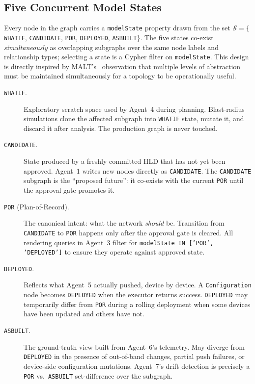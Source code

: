 \documentclass[acmtog]{acmart}
\renewcommand\_{\textunderscore\allowbreak}
\begin{document}
\subsection{Five Concurrent Model States}\label{sec:ssot:states}

Every node in the graph carries a \texttt{modelState} property
drawn from the set
$\mathcal{S} = \{$\texttt{WHAT\_IF}, \texttt{CANDIDATE},
\texttt{POR}, \texttt{DEPLOYED}, \texttt{AS\_BUILT}$\}$.
The five states co-exist \emph{simultaneously} as overlapping
subgraphs over the same node labels and relationship types;
selecting a state is a Cypher filter on \texttt{modelState}.
This design is directly inspired by MALT's~\cite{malt} observation
that multiple levels of abstraction must be maintained
simultaneously for a topology to be operationally useful.

\begin{description}
  \item[\texttt{WHAT\_IF}.]
    Exploratory scratch space used by Agent~4 during planning.
    Blast-radius simulations clone the affected subgraph into
    \texttt{WHAT\_IF} state, mutate it, and discard it after
    analysis. The production graph is never touched.

  \item[\texttt{CANDIDATE}.]
    State produced by a freshly committed HLD that has not yet been
    approved. Agent~1 writes new nodes directly as
    \texttt{CANDIDATE}. The \texttt{CANDIDATE} subgraph is the
    ``proposed future'': it co-exists with the current \texttt{POR}
    until the approval gate promotes it.

  \item[\texttt{POR} (Plan-of-Record).]
    The canonical intent: what the network \emph{should} be.
    Transition from \texttt{CANDIDATE} to \texttt{POR} happens only
    after the approval gate is cleared. All rendering queries in
    Agent~3 filter for \texttt{modelState IN ['POR', 'DEPLOYED']} to
    ensure they operate against approved state.

  \item[\texttt{DEPLOYED}.]
    Reflects what Agent~5 actually pushed, device by device. A
    \texttt{Configuration} node becomes \texttt{DEPLOYED} when the
    executor returns success. \texttt{DEPLOYED} may temporarily
    differ from \texttt{POR} during a rolling deployment when some
    devices have been updated and others have not.

  \item[\texttt{AS\_BUILT}.]
    The ground-truth view built from Agent~6's telemetry. May
    diverge from \texttt{DEPLOYED} in the presence of out-of-band
    changes, partial push failures, or device-side configuration
    mutations. Agent~7's drift detection is precisely a
    \texttt{POR} vs.\ \texttt{AS\_BUILT} set-difference over the
    subgraph.
\end{description}
\end{document}
